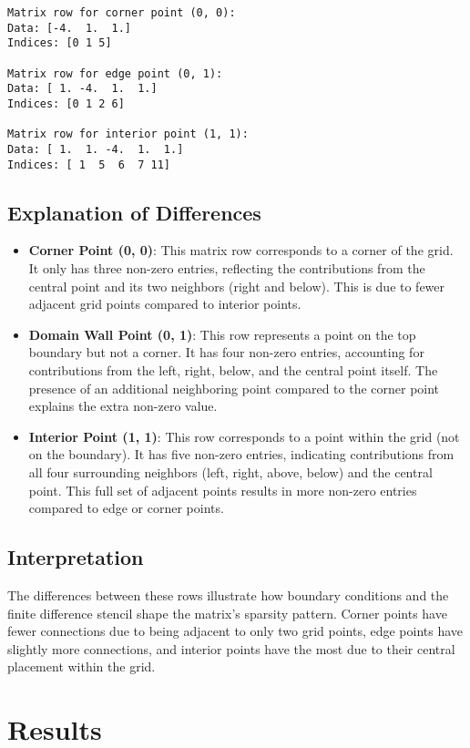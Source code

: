 \documentclass[12pt]{article}
\begin{document}
\begin{verbatim}
Matrix row for corner point (0, 0):
Data: [-4.  1.  1.]
Indices: [0 1 5]

Matrix row for edge point (0, 1):
Data: [ 1. -4.  1.  1.]
Indices: [0 1 2 6]

Matrix row for interior point (1, 1):
Data: [ 1.  1. -4.  1.  1.]
Indices: [ 1  5  6  7 11]
\end{verbatim}

\subsection{Explanation of Differences}
\begin{itemize}
    \item \textbf{Corner Point (0, 0)}: This matrix row corresponds to a corner of the grid. It only has three non-zero entries, reflecting the contributions from the central point and its two neighbors (right and below). This is due to fewer adjacent grid points compared to interior points.
    \item \textbf{Domain Wall Point (0, 1)}: This row represents a point on the top boundary but not a corner. It has four non-zero entries, accounting for contributions from the left, right, below, and the central point itself. The presence of an additional neighboring point compared to the corner point explains the extra non-zero value.
    \item \textbf{Interior Point (1, 1)}: This row corresponds to a point within the grid (not on the boundary). It has five non-zero entries, indicating contributions from all four surrounding neighbors (left, right, above, below) and the central point. This full set of adjacent points results in more non-zero entries compared to edge or corner points.
\end{itemize}

\subsection{Interpretation}
The differences between these rows illustrate how boundary conditions and the finite difference stencil shape the matrix's sparsity pattern. Corner points have fewer connections due to being adjacent to only two grid points, edge points have slightly more connections, and interior points have the most due to their central placement within the grid.


\section{Results}
\end{document}
